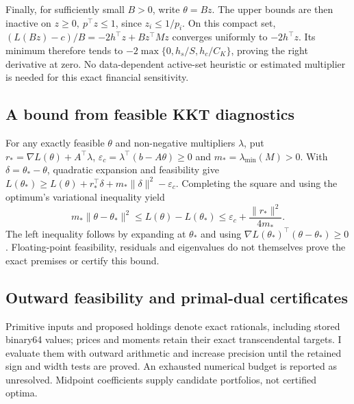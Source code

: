 \documentclass[11pt]{article}
\begin{document}
Finally, for sufficiently small $B>0$, write $\theta=Bz$.
The upper bounds are then inactive on
$z\geq0,\ p^\top z\leq1$, since $z_i\leq1/p_i$.
On this compact set,
$(L(Bz)-c)/B=-2h^\top z+Bz^\top Mz$ converges uniformly to
$-2h^\top z$. Its minimum therefore tends to
$-2\max\{0,h_s/S,h_c/C_K\}$, proving the right derivative at zero.
No data-dependent active-set heuristic or estimated multiplier is
needed for this exact financial sensitivity.

\subsection{A bound from feasible KKT diagnostics}

For any exactly feasible $\theta$ and non-negative multipliers
$\lambda$, put $r_*=\nabla L(\theta)+A^\top\lambda$,
$\varepsilon_c=\lambda^\top(b-A\theta)\geq0$ and
$m_*=\lambda_{\min}(M)>0$. With $\delta=\theta_*-\theta$,
quadratic expansion and feasibility give
$L(\theta_*)\geq L(\theta)+r_*^\top\delta+
m_*\|\delta\|^2-\varepsilon_c$. Completing the square and using
the optimum's variational inequality yield
\begin{equation}
 m_*\|\theta-\theta_*\|^2
 \leq L(\theta)-L(\theta_*)
 \leq \varepsilon_c+\frac{\|r_*\|^2}{4m_*}.
 \label{eq:h-kkt-risk-bound}
\end{equation}
The left inequality follows by expanding at $\theta_*$ and
using $\nabla L(\theta_*)^\top(\theta-\theta_*)\geq0$.
Floating-point feasibility, residuals and eigenvalues do not themselves
prove the exact premises or certify this bound.

\subsection{Outward feasibility and primal-dual certificates}
\label{app:h-validated-risk}

Primitive inputs and proposed holdings denote exact rationals, including
stored binary64 values; prices and moments retain their exact
transcendental targets. I evaluate them with outward arithmetic and
increase precision until the retained sign and width tests are proved.
An exhausted numerical budget is reported as unresolved.
Midpoint coefficients supply candidate portfolios, not certified optima.
\end{document}
